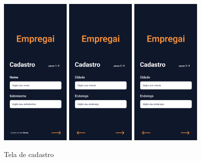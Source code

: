 \clearpage
\begin{figure}[hbb]
	\caption{Tela de cadastro}
	\begin{center}
		\includegraphics[width=0.3\textwidth]{images/Cadastro-1.png}
		\includegraphics[width=0.3\textwidth]{images/Cadastro-2.png}
		\includegraphics[width=0.3\textwidth]{images/Cadastro-3.png}
		

\end{center}
\end{figure}

